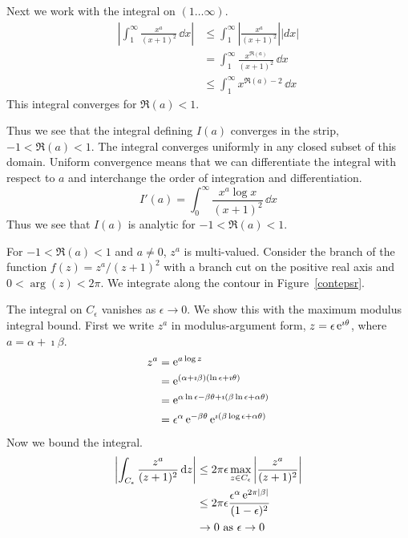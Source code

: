 {\begin{Solution}
  Next we work with the integral on $(1 \ldots \infty)$.
  \begin{align*}
    \left| \int_1^\infty \frac{x^a}{(x+1)^2}\,\dd x \right|
    &\leq \int_1^\infty \left| \frac{x^a}{(x+1)^2} \right| 
     \left| d x \right| \\
    &= \int_1^\infty \frac{x^{\Re(a)}}{(x+1)^2} \,\dd x \\
    &\leq \int_1^\infty x^{\Re(a) - 2} \,\dd x
  \end{align*}
  This integral converges for $\Re(a) < 1$.

  Thus we see that the integral defining $I(a)$ converges in the 
  strip,  $-1 < \Re(a) < 1$.  The integral converges uniformly in any closed
  subset of this domain.  Uniform convergence means that we can differentiate
  the integral with respect to $a$ and interchange the order of 
  integration and differentiation.
  \[
  I'(a) = \int_0^\infty \frac{x^a \log x}{(x+1)^2}\,\dd x
  \]
  Thus we see that $I(a)$ is analytic for $-1 < \Re(a) < 1$.

  For $-1 < \Re(a) < 1$ and $a \neq 0$, $z^a$ is multi-valued.
  Consider the branch of the function $f(z) = z^a / (z+1)^2$ with a 
  branch cut on the positive real axis and $0 < \arg(z) < 2 \pi$.
  We integrate along the contour in Figure~\ref{contepsr}.

  The integral on $C_\epsilon$ vanishes as $\epsilon \to 0$.  We show this 
  with the maximum modulus integral bound.
  First we write $z^a$ in modulus-argument form, $z = \epsilon \mathop{\mathrm{e}}\nolimits^{\imath \theta}$,
  where $a = \alpha + \imath \beta$.
  \begin{align*}
    z^a     &= \mathop{\mathrm{e}}\nolimits^{a \log z} \\
    &= \mathop{\mathrm{e}}\nolimits^{ (\alpha + \imath \beta) (\ln \epsilon + \imath \theta) } \\
    &= \mathop{\mathrm{e}}\nolimits^{ \alpha \ln \epsilon - \beta \theta + \imath ( \beta \ln \epsilon + \alpha \theta ) } \\
    &= \epsilon^\alpha \mathop{\mathrm{e}}\nolimits^{ - \beta \theta } \mathop{\mathrm{e}}\nolimits^{ \imath ( \beta \log \epsilon + \alpha \theta ) } \\
  \end{align*}
  Now we bound the integral.
  \begin{align*}
    \left| \int_{C_\epsilon} \frac{z^a}{(z+1)^2}\,\mathrm{d} z \right|
    &\leq 2 \pi \epsilon \max_{z \in C_\epsilon} \left| \frac{z^a}{(z+1)^2} \right| \\
    &\leq 2 \pi \epsilon \frac{ \epsilon^\alpha \mathop{\mathrm{e}}\nolimits^{ 2 \pi |\beta|} }{(1-\epsilon)^2}\\
    &\to 0\ \mathrm{as}\ \epsilon \to 0
  \end{align*}


\end{Solution}}
